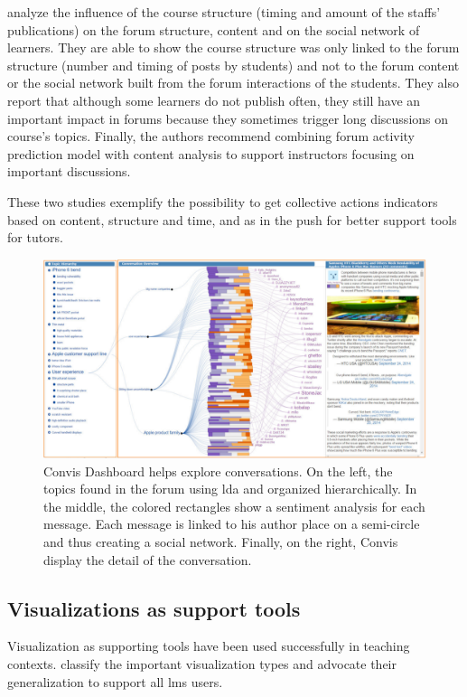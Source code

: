 \documentclass[a4paper,twoside]{article}
\begin{document}
\cite{Boroujeni2017} analyze the influence of the course structure (timing and amount of the staffs' publications) on the forum structure, content and on the social network of learners.  They are able to show the course structure was only linked to the forum structure (number and timing of posts by students) and not to the forum content or the social network built from the forum interactions of the students.  They also report that although some learners do not publish often, they still have an important impact in forums because they sometimes trigger long discussions on course's topics.  Finally, the authors recommend combining forum activity prediction model with content analysis to support instructors focusing on important discussions.

These two studies exemplify the possibility to get collective actions indicators based on content, structure and time, and as in \citep{Ezen2015} the push for better support tools for tutors.

\begin{figure}[t]
 \includegraphics[width=.5\textwidth]{images/convis.png}
 \small{
  \caption{\label{fig:convis}
   Convis Dashboard \citep{Hoque2016} helps explore conversations.  On the left, the topics found in the forum using \gls{lda} and organized hierarchically.  In the middle, the colored rectangles show a sentiment analysis for each message.  Each message is linked to his author place on a semi-circle and thus creating a social network.  Finally, on the right, Convis display the detail of the conversation.   }}
\end{figure}

\subsection{Visualizations as support tools}

Visualization as supporting tools have been used successfully in teaching contexts.  \cite{Heer2012} classify the important visualization types and \cite{Emmons2017,Leeuwen2014} advocate their generalization to support all \gls{lms} users.
\end{document}
